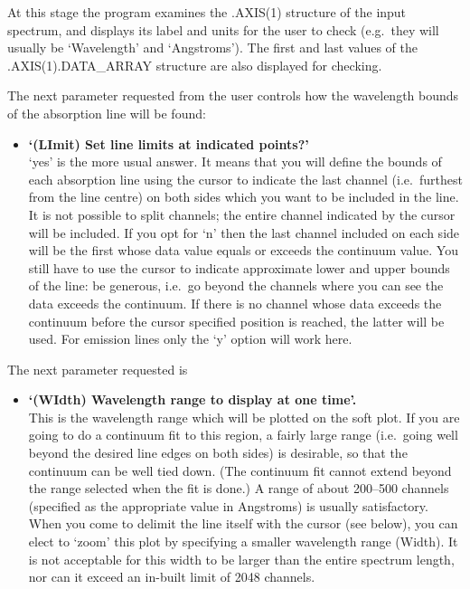 \documentclass[11pt,twoside]{article}
\newcommand{\latorhtm}[2]{#1}
\newcommand{\latorhtm}[2]{#2}
\begin{document}
   At this stage the program examines the .AXIS(1) structure of the
   input spectrum, and displays its label and units for the user to
   check (e.g.\ they will usually be `Wavelength' and `Angstroms'). The
   first and last values of the .AXIS(1).DATA\_ARRAY structure are also
   displayed for checking.

   The next parameter requested from the user controls how the
   wavelength bounds of the absorption line will be found:

\begin{itemize}
\item{\bf `(LImit) Set line limits at indicated points?'}\ \\
   `yes' is the more usual answer.  It means that you will define the
   bounds of each absorption line using the cursor to indicate the last
   channel (i.e.\ furthest from the line centre) on both sides which you
   want to be included in the line. It is not possible to split
   channels; the entire channel indicated by the cursor will be
   included. If you opt for `n' then the last channel included on each
   side will be the first whose data value equals or exceeds the
   continuum value. You still have to use the cursor to indicate
   approximate lower and upper bounds of the line: be generous, i.e.\ go
   beyond the channels where you can see the data exceeds the continuum.
   If there is no channel whose data exceeds the continuum before the
   cursor specified position is reached, the latter will be used. For
   emission lines only the `y' option will work here.
\end{itemize}

   The next parameter requested is

\begin{itemize}
\item{\bf `(WIdth) Wavelength range to display at one time'.}\ \\
   This is the wavelength range which will be plotted on the soft plot.
   If you are going to do a continuum fit to this region, a fairly large
   range (i.e.\ going well beyond the desired line edges on both sides)
   is desirable, so that the continuum can be well tied down.  (The
   continuum fit cannot extend beyond the range selected when the fit is
   done.)  A range of about 200\latorhtm{--}{-}500 channels (specified as the
   appropriate value in Angstroms) is usually satisfactory.  When you
   come to delimit the line itself with the cursor (see below), you can
   elect to `zoom' this plot by specifying a smaller wavelength range
   (Width). It is not acceptable for this width to be larger than the
   entire spectrum length, nor can it exceed an in-built limit of 2048
   channels.
\end{itemize}
\end{document}
